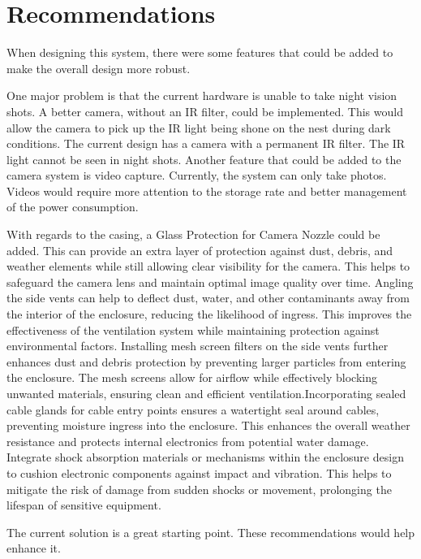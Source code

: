 \documentclass[class=report,11pt,crop=false]{standalone}
\begin{document}
\chapter{Recommendations \label{ch:recommendations}}

When designing this system, there were some features that could be added to make the overall design more robust. 

One major problem is that the current hardware is unable to take night vision shots. A better camera, without an IR filter, could be implemented. This would allow the camera to pick up the IR light being shone on the nest during dark conditions. The current design has a camera with a permanent IR filter. The IR light cannot be seen in night shots. Another feature that could be added to the camera system is video capture. Currently, the system can only take photos. Videos would require more attention to the storage rate and better management of the power consumption. 

With regards to the casing, a Glass Protection for Camera Nozzle could be added. This can provide an extra layer of protection against dust, debris, and weather elements while still allowing clear visibility for the camera. This helps to safeguard the camera lens and maintain optimal image quality over time.  Angling the side vents can help to deflect dust, water, and other contaminants away from the interior of the enclosure, reducing the likelihood of ingress. This improves the effectiveness of the ventilation system while maintaining protection against environmental factors. Installing mesh screen filters on the side vents further enhances dust and debris protection by preventing larger particles from entering the enclosure. The mesh screens allow for airflow while effectively blocking unwanted materials, ensuring clean and efficient ventilation.Incorporating sealed cable glands for cable entry points ensures a watertight seal around cables, preventing moisture ingress into the enclosure. This enhances the overall weather resistance and protects internal electronics from potential water damage. Integrate shock absorption materials or mechanisms within the enclosure design to cushion electronic components against impact and vibration. This helps to mitigate the risk of damage from sudden shocks or movement, prolonging the lifespan of sensitive equipment.

The current solution is a great starting point. These recommendations would help enhance it. 


\ifstandalone

\printnoidxglossary[type=\acronymtype,nonumberlist]
\fi
\end{document}
